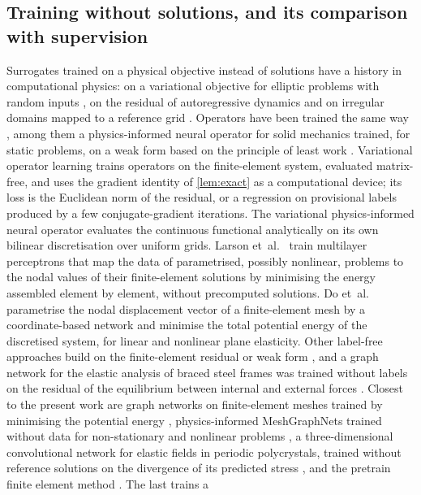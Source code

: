 \subsection{Training without solutions, and its comparison with supervision}
Surrogates trained on a physical objective instead of solutions have a history in
computational physics: on a variational objective for elliptic problems with random inputs \cite{Zhu2019},
on the residual of autoregressive dynamics \cite{GenevaZabaras2020} and on irregular domains mapped to a reference grid \cite{Gao2021PhyGeoNet}. Operators have been
trained the same way
\cite{Li2024PINO,WangWangPerdikaris2021}, among them a physics-informed neural operator for
solid mechanics trained, for static problems, on a weak form based on the principle of least
work \cite{Kaewnuratchadasorn2024PINOS}. Variational operator learning \cite{Xu2024VOL}
trains operators on the finite-element system, evaluated matrix-free, and uses the gradient
identity of \cref{lem:exact} as a computational device; its loss is the Euclidean norm of
the residual, or a regression on provisional labels produced by a few conjugate-gradient
iterations. The variational physics-informed neural operator \cite{Eshaghi2025VINO}
evaluates the continuous functional analytically on its own bilinear discretisation over
uniform grids. Larson et~al.~\cite{Larson2026MLPEnergy} train multilayer perceptrons that
map the data of parametrised, possibly nonlinear, problems to the nodal values of their
finite-element solutions by minimising the energy assembled element by element, without precomputed solutions. Do
et~al.~\cite{Do2026MNES} parametrise the nodal displacement
vector of a finite-element mesh by a coordinate-based network and minimise the total
potential energy of the discretised system, for linear and nonlinear plane elasticity.
Other label-free approaches build on the finite-element residual or
weak form \cite{Lee2025FEONet,Uriarte2022,Gao2022,Goswami2022}, and a graph network for the
elastic analysis of braced steel frames was trained without labels on the residual of the
equilibrium between internal and external forces \cite{Song2023StructGNN}. Closest to the present work
are graph networks on finite-element meshes trained by minimising the potential energy
\cite{Dalton2023}, physics-informed MeshGraphNets trained without data for non-stationary
and nonlinear problems \cite{Wurth2024}, a three-dimensional convolutional network for
elastic fields in periodic polycrystals, trained without reference solutions on the
divergence of its predicted stress \cite{MonteiroFernandes2025}, and the pretrain finite element method \cite{Wang2026PretrainFEM}. The last trains a
